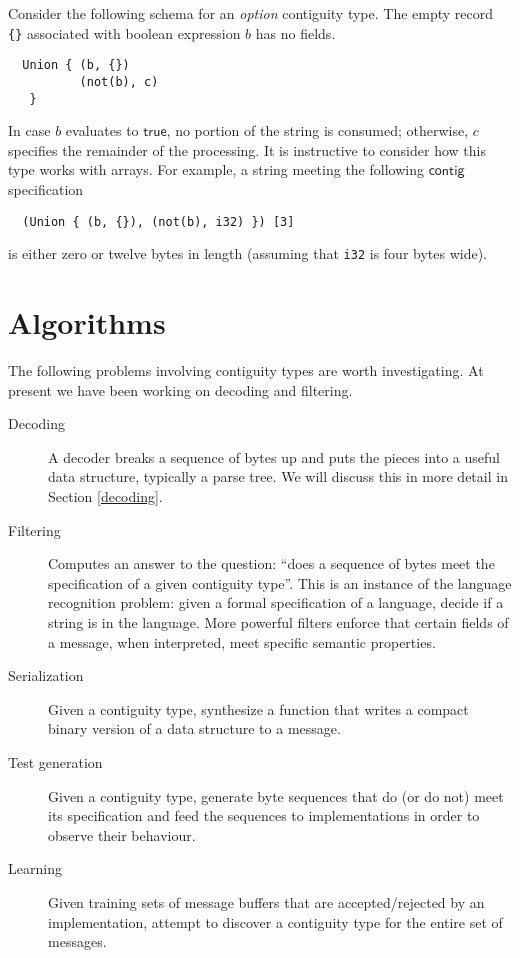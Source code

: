 \documentclass[sigplan,10pt,anonymous,review]{acmart}\settopmatter{printfolios=true,printccs=false,printacmref=false}
\newcommand{\konst}[1]{\ensuremath{\mathsf{#1}}}
\begin{document}
\begin{example}
Consider the following schema for an \emph{option} contiguity
type. The empty record \verb+{}+ associated with boolean expression
$b$ has no fields.

\begin{verbatim}
  Union { (b, {})
          (not(b), c)
   }
\end{verbatim}

\noindent In case $\mathit{b}$ evaluates to \konst{true}, no portion of the
string is consumed; otherwise, $c$ specifies the remainder of the
processing. It is instructive to consider how this type works with
arrays. For example, a string meeting the following \konst{contig} specification

\begin{verbatim}
  (Union { (b, {}), (not(b), i32) }) [3]
\end{verbatim}

\noindent is either zero or twelve bytes in length (assuming that
\verb+i32+ is four bytes wide).

\end{example}

\section{Algorithms}

The following problems involving contiguity types are worth
investigating. At present we have been working on decoding and
filtering.

\begin{description}

\item [Decoding] A decoder breaks a sequence of bytes up and puts the
  pieces into a useful data structure, typically a parse tree. We will
  discuss this in more detail in Section \ref{decoding}.

\item [Filtering] Computes an answer to the question: ``does a
  sequence of bytes meet the specification of a given contiguity
  type''. This is an instance of the language recognition problem:
  given a formal specification of a language, decide if a string is in
  the language. More powerful filters enforce that certain fields of a
  message, when interpreted, meet specific semantic properties.

\item [Serialization] Given a contiguity type, synthesize a function
  that writes a compact binary version of a data structure to a message.

\item [Test generation] Given a contiguity type, generate byte
  sequences that do (or do not) meet its specification and feed the
  sequences to implementations in order to observe their behaviour.

\item [Learning] Given training sets of message buffers that are
  accepted/rejected by an implementation, attempt to discover a
  contiguity type for the entire set of messages.

\end{description}
\end{document}
